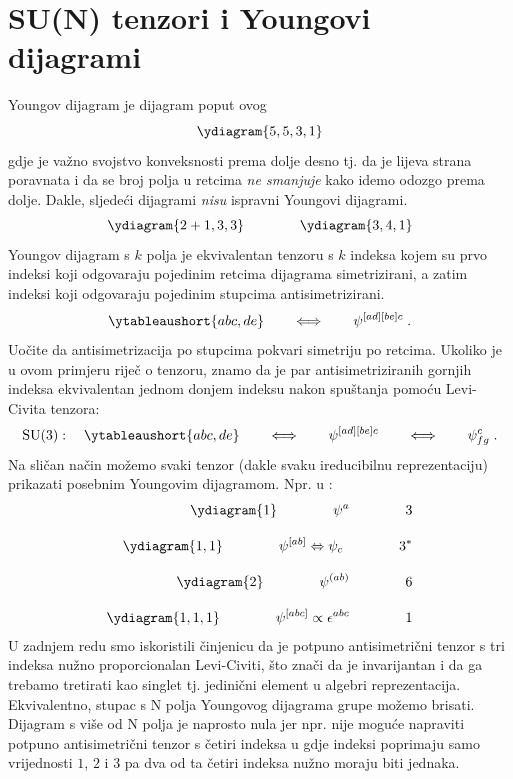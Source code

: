\section{SU(N) tenzori i Youngovi dijagrami}

Youngov dijagram je dijagram poput ovog
$$
\ydiagram{5,5,3,1}
$$
gdje je važno svojstvo konveksnosti prema dolje desno tj. da
je lijeva strana poravnata i da se broj polja u retcima
\emph{ne smanjuje} kako idemo odozgo prema dolje.
Dakle, sljedeći dijagrami \emph{nisu} ispravni Youngovi dijagrami.
$$
\ydiagram{2+1,3,3} \qquad  \qquad  \ydiagram{3,4,1}
$$
Youngov dijagram s $k$ polja je ekvivalentan  tenzoru s
$k$ indeksa kojem su prvo indeksi koji odgovaraju pojedinim
retcima dijagrama simetrizirani, a zatim indeksi koji odgovaraju
pojedinim stupcima antisimetrizirani.
\begin{equation}
\ytableaushort{abc, de} \qquad \Longleftrightarrow \qquad
\psi^{[ad][be]c} \;.
\label{eq:tbltensor}
\end{equation}
Uočite da antisimetrizacija po stupcima pokvari simetriju po retcima.
Ukoliko je u ovom primjeru riječ o  tenzoru, znamo da je par
antisimetriziranih gornjih indeksa ekvivalentan jednom donjem indeksu
nakon spuštanja pomoću Levi-Civita tenzora:
\begin{equation}
\SU{3}:\quad 
\ytableaushort{abc, de} \qquad \Longleftrightarrow \qquad
\psi^{[ad][be]c} \qquad \Longleftrightarrow \qquad
\psi^{c}_{fg} \;.
\label{eq:tbltensorsu3}
\end{equation}
Na sličan način možemo svaki tenzor (dakle svaku ireducibilnu reprezentaciju) prikazati
posebnim Youngovim dijagramom. Npr. u :
\begin{align}
\ydiagram{1} \qquad\qquad \psi^a \qquad\qquad 3  \\[2ex]
\ydiagram{1,1} \qquad\qquad \psi^{[ab]} \Leftrightarrow \psi_c  \qquad\qquad 3^*  \\[2ex]
\ydiagram{2} \qquad\qquad \psi^{(ab)}  \qquad\qquad 6  \\[2ex]
\ydiagram{1,1,1} \qquad\qquad \psi^{[abc]} \propto \epsilon^{abc} \qquad\qquad 1
\end{align}
U zadnjem redu smo iskoristili činjenicu da je potpuno antisimetrični tenzor s tri
indeksa nužno proporcionalan Levi-Civiti, što znači da je invarijantan i
da ga trebamo tretirati kao singlet tj. jedinični element u algebri
reprezentacija. Ekvivalentno, stupac s N polja
Youngovog dijagrama  grupe možemo brisati. Dijagram s više od N polja
je naprosto nula jer npr. nije moguće napraviti potpuno antisimetrični tenzor
s četiri indeksa u  gdje indeksi poprimaju
samo vrijednosti $1$, $2$ i $3$ pa dva od ta četiri indeksa nužno moraju
biti jednaka.


